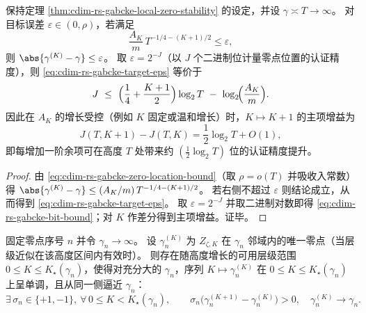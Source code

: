 \begin{theorem}[层级余项阶与二进制认证精度的增益律]\label{thm:cdim-rs-gabcke-bit-gain}
保持定理 \ref{thm:cdim-rs-gabcke-local-zero-stability} 的设定，并设 \(\gamma\asymp T\to\infty\)。
对目标误差 \(\varepsilon\in(0,\rho)\)，若满足
\begin{equation}\label{eq:cdim-rs-gabcke-target-eps}
\frac{A_K}{m}\,T^{-1/4-(K+1)/2}\le \varepsilon,
\end{equation}
则 \(\abs{\gamma^{(K)}-\gamma}\le \varepsilon\)。
取 \(\varepsilon=2^{-J}\)（以 \(J\) 个二进制位计量零点位置的认证精度），则 \eqref{eq:cdim-rs-gabcke-target-eps} 等价于
\begin{equation}\label{eq:cdim-rs-gabcke-bit-bound}
J\ \le\ \Bigl(\frac14+\frac{K+1}{2}\Bigr)\log_2 T\ -\ \log_2\!\Bigl(\frac{A_K}{m}\Bigr).
\end{equation}
因此在 \(A_K\) 的增长受控（例如 \(K\) 固定或温和增长）时，\(K\mapsto K+1\) 的主项增益为
\[
J(T,K+1)-J(T,K)=\frac12\log_2 T+O(1),
\]
即每增加一阶余项可在高度 \(T\) 处带来约 \((\tfrac12\log_2 T)\) 位的认证精度提升。
\end{theorem}
\begin{proof}
由 \eqref{eq:cdim-rs-gabcke-zero-location-bound}（取 \(\rho=o(T)\) 并吸收入常数）得
\(
\abs{\gamma^{(K)}-\gamma}\le (A_K/m)\,T^{-1/4-(K+1)/2}
\)。
若右侧不超过 \(\varepsilon\) 则结论成立，从而得到 \eqref{eq:cdim-rs-gabcke-target-eps}。
取 \(\varepsilon=2^{-J}\) 并取二进制对数即得 \eqref{eq:cdim-rs-gabcke-bit-bound}；对 \(K\) 作差分得到主项增益。证毕。
\end{proof}

\begin{conjecture}[高位零点的单侧层级收敛]\label{conj:cdim-rs-gabcke-one-sided-convergence}
固定零点序号 \(n\) 并令 \(\gamma_n\to\infty\)。
设 \(\gamma_n^{(K)}\) 为 \(Z_{\zeta,K}\) 在 \(\gamma_n\) 邻域内的唯一零点（当层级近似在该高度区间内有效时）。
则存在随高度增长的可用层级范围 \(0\le K\le K_\star(\gamma_n)\)，使得对充分大的 \(\gamma_n\)，序列 \(K\mapsto \gamma_n^{(K)}\) 在 \(0\le K\le K_\star(\gamma_n)\) 上呈单调，且从同一侧逼近 \(\gamma_n\)：
\[
\exists\,\sigma_n\in\{+1,-1\},\ \forall\,0\le K<K_\star(\gamma_n),\qquad
\sigma_n\bigl(\gamma_n^{(K+1)}-\gamma_n^{(K)}\bigr)>0,
\quad
\gamma_n^{(K)}\to\gamma_n.
\]
\end{conjecture}

\endinput
